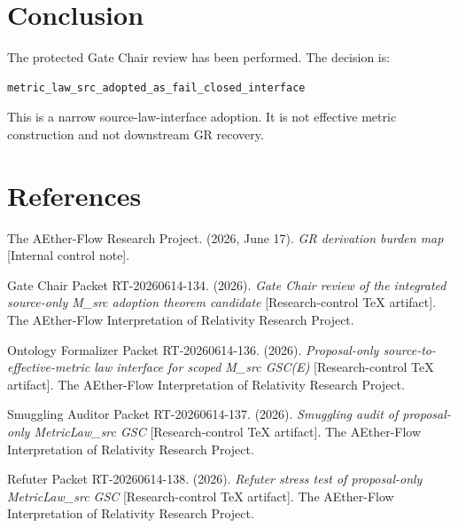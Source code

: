 \documentclass[11pt]{article}
\begin{document}
\section{Conclusion}

The protected Gate Chair review has been performed. The decision is:

\begin{verbatim}
metric_law_src_adopted_as_fail_closed_interface
\end{verbatim}

This is a narrow source-law-interface adoption. It is not effective metric
construction and not downstream GR recovery.

\section*{References}

The AEther-Flow Research Project. (2026, June 17). \textit{GR derivation
burden map} [Internal control note].

Gate Chair Packet RT-20260614-134. (2026). \textit{Gate Chair review of the
integrated source-only M\_src adoption theorem candidate} [Research-control
TeX artifact]. The AEther-Flow Interpretation of Relativity Research Project.

Ontology Formalizer Packet RT-20260614-136. (2026). \textit{Proposal-only
source-to-effective-metric law interface for scoped M\_src GSC(E)}
[Research-control TeX artifact]. The AEther-Flow Interpretation of Relativity
Research Project.

Smuggling Auditor Packet RT-20260614-137. (2026). \textit{Smuggling audit of
proposal-only MetricLaw\_src GSC} [Research-control TeX artifact]. The
AEther-Flow Interpretation of Relativity Research Project.

Refuter Packet RT-20260614-138. (2026). \textit{Refuter stress test of
proposal-only MetricLaw\_src GSC} [Research-control TeX artifact]. The
AEther-Flow Interpretation of Relativity Research Project.
\end{document}
